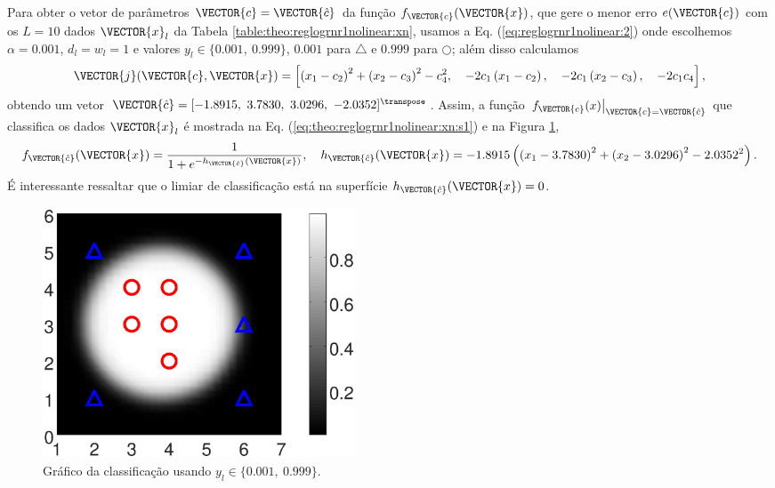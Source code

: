 \begin{SolutionT}\label{sol:theo:reglogrnr1nolinear:s1}
Para obter o vetor de parâmetros $\VECTOR{c}=\VECTOR{\hat{c}}$ da função $f_{\VECTOR{c}}(\VECTOR{x})$, 
que gere o menor erro $e(\VECTOR{c})$
com os $L=10$ dados $\VECTOR{x}_l$ da Tabela \ref{table:theo:reglogrnr1nolinear:xn},
usamos a Eq. (\ref{eq:reglogrnr1nolinear:2}) onde escolhemos $\alpha=0.001$, $d_l=w_l=1$ e valores $y_l \in \{0.001,~ 0.999\}$,
$0.001$ para $\bigtriangleup$ e $0.999$ para $\bigcirc$;
além disso calculamos 
\begin{equation}
\VECTOR{j}(\VECTOR{c},\VECTOR{x}) = 
\left[ 
\left(x_1-c_2\right)^2 + \left(x_2-c_3\right)^2 -c_4^2, \quad 
-2c_1\left(x_1-c_2\right), \quad
-2c_1\left(x_2-c_3\right), \quad
-2c_1c_4
\right],
\end{equation}
obtendo um vetor $\VECTOR{\hat{c}}=[-1.8915,~ 3.7830,~ 3.0296,~ -2.0352]^{\transpose}$.
Assim, a função $\left.f_{\VECTOR{c}}(x)\right|_{\VECTOR{c}=\VECTOR{\hat{c}}}$ que classifica os dados $\VECTOR{x}_l$
é mostrada na Eq. (\ref{eq:theo:reglogrnr1nolinear:xn:s1}) e na Figura \ref{fig:theo:reglogrnr1nolinear:xn:s1},
\begin{equation}\label{eq:theo:reglogrnr1nolinear:xn:s1}
f_{\VECTOR{\hat{c}}}(\VECTOR{x})= \frac{1}{1+e^{-h_{\VECTOR{\hat{c}}}(\VECTOR{x})}},
\quad
h_{\VECTOR{\hat{c}}}(\VECTOR{x}) = -1.8915\left( \left(x_1-3.7830\right)^2 + \left(x_2-3.0296\right)^2 -2.0352^2\right).\\
\end{equation}
É interessante ressaltar que o limiar de classificação está na superfície $h_{\VECTOR{\hat{c}}}(\VECTOR{x})=0$.
\end{SolutionT}
\begin{figure}[!h]
        \centering
        \includegraphics[width=0.45\textwidth]{chapters/classificacao/mfiles/reglogrnr1nolinear/ex1s2-reglogrnr1nolinear.eps}
        \caption{Gráfico da classificação usando $y_l \in \{0.001,~ 0.999\}$.}
        \label{fig:theo:reglogrnr1nolinear:xn:s1}
\end{figure}




